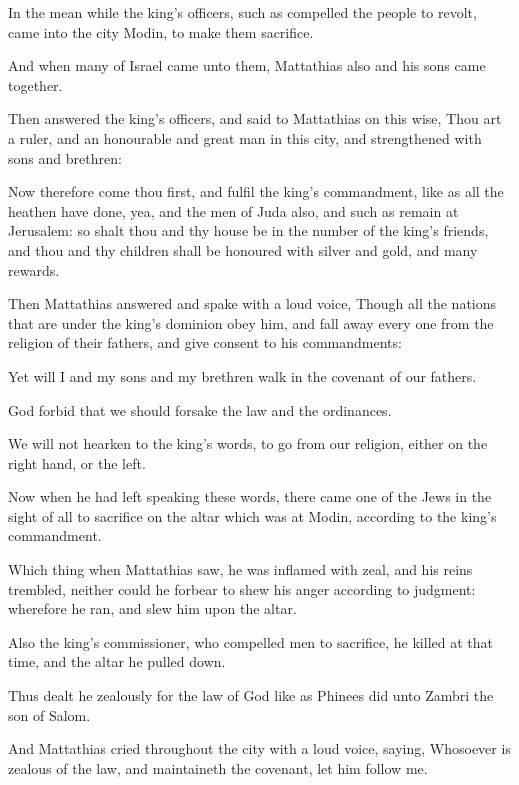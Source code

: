 {\par }{\PP {}In the mean while the king’s officers, such as compelled the people to revolt, came into the city Modin, to make them sacrifice.
\par }{\PP {}And when many of Israel came unto them, Mattathias also and his sons came together.
\par }{\PP {}Then answered the king’s officers, and said to Mattathias on this wise, Thou art a ruler, and an honourable and great man in this city, and strengthened with sons and brethren:
\par }{\PP {}Now therefore come thou first, and fulfil the king’s commandment, like as all the heathen have done, yea, and the men of Juda also, and such as remain at Jerusalem: so shalt thou and thy house be in the number of the king’s friends, and thou and thy children shall be honoured with silver and gold, and many rewards.
\par }{\PP {}Then Mattathias answered and spake with a loud voice, Though all the nations that are under the king’s dominion obey him, and fall away every one from the religion of their fathers, and give consent to his commandments:
\par }{\PP {}Yet will I and my sons and my brethren walk in the covenant of our fathers.
\par }{\PP {}God forbid that we should forsake the law and the ordinances.
\par }{\PP {}We will not hearken to the king’s words, to go from our religion, either on the right hand, or the left.
\par }{\PP {}Now when he had left speaking these words, there came one of the Jews in the sight of all to sacrifice on the altar which was at Modin, according to the king’s commandment.
\par }{\PP {}Which thing when Mattathias saw, he was inflamed with zeal, and his reins trembled, neither could he forbear to shew his anger according to judgment: wherefore he ran, and slew him upon the altar.
\par }{\PP {}Also the king’s commissioner, who compelled men to sacrifice, he killed at that time, and the altar he pulled down.
\par }{\PP {}Thus dealt he zealously for the law of God like as Phinees did unto Zambri the son of Salom.
\par }{\PP {}And Mattathias cried throughout the city with a loud voice, saying, Whosoever is zealous of the law, and maintaineth the covenant, let him follow me.
}
